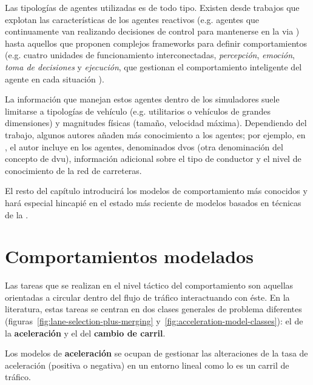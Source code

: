 Las tipologías de agentes utilizadas es de todo tipo. Existen desde trabajos que explotan las características de los agentes reactivos (e.g. agentes que continuamente van realizando decisiones de control para mantenerse en la via \cite{Ehlert2001}) hasta aquellos que proponen complejos frameworks para definir comportamientos (e.g. cuatro unidades de funcionamiento interconectadas, \textit{percepción}, \textit{emoción}, \textit{toma de decisiones} y \textit{ejecución}, que gestionan el comportamiento inteligente del agente en cada situación \cite{al2001framework}).

La información que manejan estos agentes dentro de los simuladores suele limitarse a tipologías de vehículo (e.g. utilitarios o vehículos de grandes dimensiones) y magnitudes físicas (tamaño, velocidad máxima). Dependiendo del trabajo, algunos autores añaden más conocimiento a los agentes; por ejemplo, en \cite{hidas2002}, el autor incluye en los agentes, denominados \glspl{dvo} (otra denominación del concepto de \gls{dvu}), información adicional sobre el tipo de conductor y el nivel de conocimiento de la red de carreteras.

El resto del capítulo introducirá los modelos de comportamiento más conocidos y hará especial hincapié en el estado más reciente de modelos basados en técnicas de la .

\section{Comportamientos modelados}

Las tareas que se realizan en el nivel táctico del comportamiento son aquellas orientadas a circular dentro del flujo de tráfico interactuando con éste. En la literatura, estas tareas se centran en dos clases generales de problema diferentes (figuras~\ref{fig:lane-selection-plus-merging} y~\ref{fig:acceleration-model-classes}): el de la \textbf{aceleración} y el del \textbf{cambio de carril}.

Los modelos de \textbf{aceleración} se ocupan de gestionar las alteraciones de la tasa de aceleración (positiva o negativa) en un entorno lineal como lo es un carril de tráfico.

